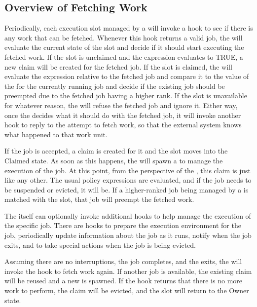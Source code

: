 \subsection{\label{sec:job-hooks-overview}
Overview of Fetching Work}

Periodically, each execution slot managed by a  will
invoke a hook to see if there is any work that can be fetched.
Whenever this hook returns a valid job, the  will
evaluate the current state of the slot and decide if it should start
executing the fetched work.
If the slot is unclaimed and the  expression evaluates to
TRUE, a new claim will be created for the fetched job.
If the slot is claimed, the  will evaluate the
 expression relative to the fetched job and compare it to
the value of the  for the currently running job and decide
if the existing job should be preempted due to the fetched job having
a higher rank.
If the slot is unavailable for whatever reason, the 
will refuse the fetched job and ignore it.
Either way, once the  decides what it should do with
the fetched job, it will invoke another hook to reply to the attempt
to fetch work, so that the external system knows what happened to that
work unit.

If the job is accepted, a claim is created for it and the slot moves
into the Claimed state.
As soon as this happens, the  will spawn a
 to manage the execution of the job.
At this point, from the perspective of the , this claim
is just like any other.
The usual policy expressions are evaluated, and if the job needs to be
suspended or evicted, it will be.
If a higher-ranked job being managed by a  is matched
with the slot, that job will preempt the fetched work.

The  itself can optionally invoke additional hooks to
help manage the execution of the specific job.
There are hooks to prepare the execution environment for the job,
periodically update information about the job as it runs, notify when
the job exits, and to take special actions when the job is being evicted.

Assuming there are no interruptions, the job completes, and the
 exits, the  will invoke the hook to
fetch work again.
If another job is available, the existing claim will be reused and a
new  is spawned.
If the hook returns that there is no more work to perform, the claim
will be evicted, and the slot will return to the Owner state.


